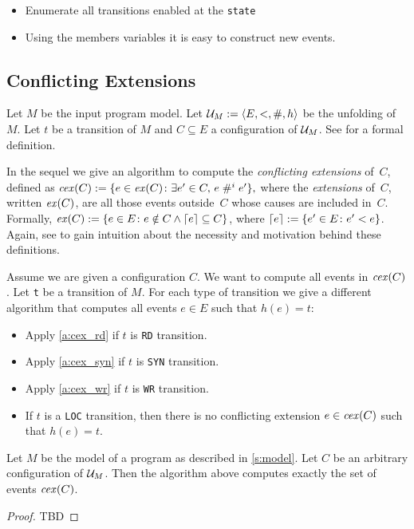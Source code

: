 \documentclass{llncs}
\begin{document}
\begin{itemize}
\item
  Enumerate all transitions enabled at the \verb!state!
\item
  Using the members variables it is easy to construct new events.
\end{itemize}

\subsection{Conflicting Extensions}


Let $M$ be the input program model.
Let $\mathcal{U}_{M} \mathrel{:=} \langle E,<,\mathrel{\#},h\rangle$ be the unfolding of $M$.
Let $t$ be a transition of $M$ and $C \subseteq E$ a configuration of $\mathcal{U}_{M}$.
See \cite{RSSK15long} for a formal definition.

In the sequel we give an algorithm to compute the \emph{conflicting extensions}
of~$C$, defined as
$
\mathop{\mathit{cex}} (C) \mathrel{:=}
{\{ e \in \mathop{\mathit{ex}} (C) \colon \exists e' \in C,\, e \mathrel{\#^i_{}}{} e' \mathclose \}},
$
where the \emph{extensions} of~$C$, written $\mathop{\mathit{ex}} (C)$,
are all those events outside~$C$ whose causes are included in~$C$.
Formally,
$
\mathop{\mathit{ex}} (C) \mathrel{:=}
{\{ e \in E \colon e \notin C \land \left \lceil e \right \rceil \subseteq C \mathclose \}}
$, where
$\left \lceil e \right \rceil \mathrel{:=} {\{ e' \in E \colon e' < e \mathclose \}}$.
Again, see \cite{RSSK15long} to gain intuition about the necessity and motivation
behind these definitions.

Assume we are given a configuration $C$.
We want to compute all events in $\mathop{\mathit{cex}} (C)$.
Let \verb!t! be a transition of $M$.
For each type of transition we give a different algorithm that computes all
events $e \in E$ such that $h(e) = t$:
\begin{itemize}
\item Apply \cref{a:cex_rd} if $t$ is \verb!RD! transition.
\item Apply \cref{a:cex_syn} if $t$ is \verb!SYN! transition.
\item Apply \cref{a:cex_wr} if $t$ is \verb!WR! transition.
\item If $t$ is a \verb!LOC! transition, then there is no conflicting extension
$e \in \mathop{\mathit{cex}} (C)$ such that $h(e) = t$.
\end{itemize}

\begin{theorem}
Let $M$ be the model of a program as described in \cref{s:model}.
Let $C$ be an arbitrary configuration of $\mathcal{U}_{M}$.
Then the algorithm above computes exactly the set of events $\mathop{\mathit{cex}} (C)$.
\end{theorem}
\begin{proof}
TBD
\end{proof}
\end{document}
